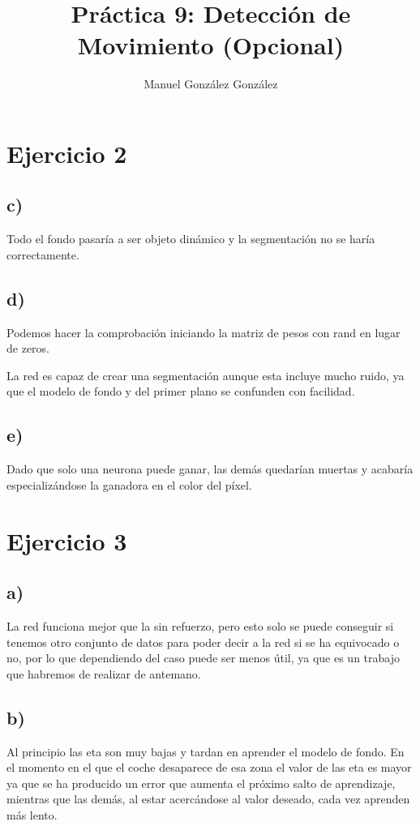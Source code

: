 \documentclass[12pt,a4paper]{article}
\author{Manuel González González}
\title{Práctica 9: Detección de Movimiento (Opcional)}
\begin{document}
\maketitle


\section*{Ejercicio 2}
\subsection*{c)}
Todo el fondo pasaría a ser objeto dinámico y la segmentación no se haría correctamente.

\subsection*{d)}
Podemos hacer la comprobación iniciando la matriz de pesos con rand en lugar de zeros.

La red es capaz de crear una segmentación aunque esta incluye mucho ruido, ya que el modelo de fondo y del primer plano se confunden con facilidad.

\subsection*{e)}

Dado que solo una neurona puede ganar, las demás quedarían muertas y acabaría especializándose la ganadora en el color del píxel.

\section*{Ejercicio 3}
\subsection*{a)}
La red funciona mejor que la sin refuerzo, pero esto solo se puede conseguir si tenemos otro conjunto de datos para poder decir a la red si se ha equivocado o no, por lo que dependiendo del caso puede ser menos útil, ya que es un trabajo que habremos de realizar de antemano.

\subsection*{b)}
Al principio las eta son muy bajas y tardan en aprender el modelo de fondo. En el momento en el que el coche desaparece de esa zona el valor de las eta es mayor ya que se ha producido un error que aumenta el próximo salto de aprendizaje, mientras que las demás, al estar acercándose al valor deseado, cada vez aprenden más lento.
\end{document}
